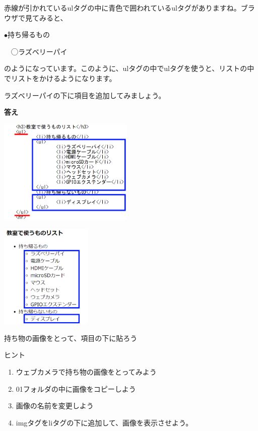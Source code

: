 \documentclass[a4paper,12pt]{jarticle}
\begin{document}
\bigskip
\flushleft

赤線が引かれているulタグの中に青色で囲われているulタグがありますね。ブラウザで見てみると、

${\bullet}持ち帰るもの$

\ \ ◯ラズベリーパイ

のようになっています。このように、ulタグの中でulタグを使うと、リストの中でリストをかけるようになります。

ラズベリーパイの下に項目を追加してみましょう。


\bigskip


\clearpage\flushleft
\textbf{答え}


\bigskip

\centering    
\begin{minipage}{0.45\linewidth}
  \includegraphics[width=\linewidth,height=5cm]{textbook-img1043.png}
\end{minipage}
\hfill
\vspace{20pt}
\begin{minipage}{0.45\linewidth}
  \includegraphics[width=\linewidth,height=5cm]{textbook-img1044.png}
\end{minipage}

\bigskip
\flushleft

\theQuestion\label{Q:hasAnswer04-11}

持ち物の画像をとって、項目の下に貼ろう

ヒント

\begin{enumerate}
  \item
        ウェブカメラで持ち物の画像をとってみよう
  \item
        01フォルダの中に画像をコピーしよう
  \item 画像の名前を変更しよう
  \item
        imgタグをliタグの下に追加して、画像を表示させよう。
\end{enumerate}

\bigskip


\clearpage
\end{document}
